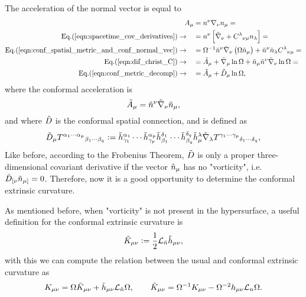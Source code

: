 The acceleration of the normal vector is equal to
\begin{align}
    A_\mu &= n^\nu \nabla_\nu n_\mu =\nonumber\\
    \text{Eq.(\ref{eqn:spacetime_cov_derivatives})}\rightarrow \quad &= n^\nu \left[\Tilde{\nabla}_\nu + C^\lambda{}_{\nu\mu}n_\lambda\right]=\nonumber\\
    \text{Eq.(\ref{eqn:conf_spatial_metric_and_conf_normal_vec})}\rightarrow \quad &= \Omega^{-1}\Tilde{n}^\nu \Tilde{\nabla}_\nu\left(\Omega \Tilde{n}_\mu\right)+\Tilde{n}^\nu \Tilde{n}_\lambda C^\lambda{}_{\nu\mu}=\nonumber\\
    \text{Eq.(\ref{eqn:dif_christ_C})}\rightarrow \quad &= \Tilde{A}_\mu + \Tilde{\nabla}_\mu \ln\Omega + \Tilde{n}_\mu \Tilde{n}^\nu \Tilde{\nabla}_\nu\ln\Omega=\nonumber\\
    \text{Eq.(\ref{eqn:conf_metric_decomp})}\rightarrow \quad &= \Tilde{A}_\mu + \Tilde{D}_\mu \ln\Omega,
    \label{eqn:conf_acceleration}
\end{align}
where the conformal acceleration is
\begin{equation}
    \Tilde{A}_\mu = \Tilde{n}^\nu \Tilde{\nabla}_\nu \Tilde{n}_\mu,
\end{equation}
and where $\Tilde{D}$ is the conformal spatial connection, and is defined as
\begin{equation}
    \Tilde{D}_\mu T^{\alpha_1\cdots \alpha_p}{}_{\beta_1\cdots\beta_q} := \Tilde{h}^{\alpha_1}_{\gamma_1}\cdots \Tilde{h}^{\alpha_p}_{\gamma_p} \Tilde{h}^{\delta_1}_{\beta_1}\cdots\Tilde{h}^{\delta_q}_{\beta_q}\Tilde{h}^{\lambda}_{\mu}\Tilde{\nabla}_\lambda T^{\gamma_1\cdots \gamma_p}{}_{\delta_1\cdots\delta_q},
    \label{eqn:conf_spatial_der}
\end{equation}
Like before, according to the Frobenius Theorem, $\Tilde{D}$ is only a proper three-dimensional covariant derivative if the vector $\Tilde{n}_\mu$ has no "vorticity", i.e. $\Tilde{D}_{[\nu} \Tilde{n}_{\mu]}=0$. Therefore, now it is a good opportunity to determine the conformal extrinsic curvature.

As mentioned before, when "vorticity" is not present in the hypersurface, a useful definition for the conformal extrinsic curvature is
\begin{equation}
    \Tilde{K}_{\mu\nu}:=\frac{1}{2}\mathcal{L}_{\Tilde{n}} \Tilde{h}_{\mu\nu},
\end{equation}
with this we can compute the relation between the usual and conformal extrinsic curvature as
\begin{equation}
    K_{\mu\nu}=\Omega\Tilde{K}_{\mu\nu}+\Tilde{h}_{\mu\nu}\mathcal{L}_{\Tilde{n}}\Omega, \qquad \Tilde{K}_{\mu\nu}=\Omega^{-1}K_{\mu\nu}-\Omega^{-2}h_{\mu\nu}\mathcal{L}_n\Omega.
\end{equation}

